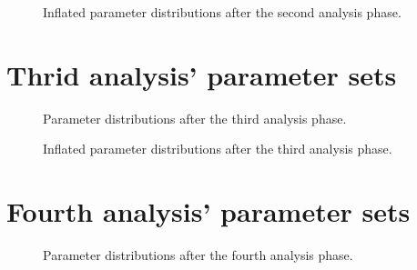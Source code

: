 \documentclass[12pt,twoside]{report}
\begin{document}
\begin{figure}[h!]
    \centering
    
    \caption{Inflated parameter distributions after the second analysis phase.}
    \label{fig:}
\end{figure}

\clearpage

\section{Thrid analysis' parameter sets}

\begin{figure}[h!]
    \centering
    
    \caption{Parameter distributions after the third analysis phase.}
    \label{fig:Forecast3_parameters_noInflation}
\end{figure}

\begin{figure}[h!]
	\centering
	
    \caption{Inflated parameter distributions after the third analysis phase.}
    \label{fig:Forecast3_parameters_Inflation}
\end{figure}

\clearpage

\section{Fourth analysis' parameter sets}

\begin{figure}[h!]
	\centering
	
    \caption{Parameter distributions after the fourth analysis phase.}
    \label{fig:Forecast4_parameters_noInflation}
\end{figure}

\clearpage

\titlespacing*{\chapter}{0pt}{-17.5mm}{40pt}


\let\cleardoublepage\clearpage
\end{document}
